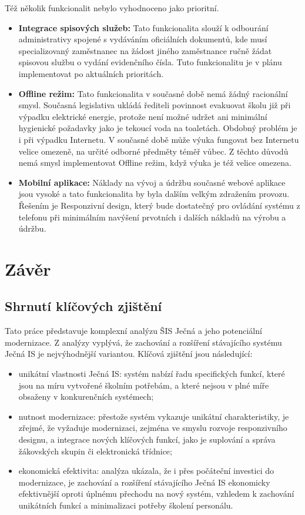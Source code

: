 \documentclass[FM,Proj]{tulthesis}
\begin{document}
Též několik funkcionalit nebylo vyhodnoceno jako prioritní.
\begin{itemize}
    \item \textbf{Integrace spisových služeb:} Tato funkcionalita slouží k odbourání
    administrativy spojené s vydáváním oficiálních dokumentů, kde musí specializovaný zaměstnanec
    na žádost jiného zaměstnance ručně žádat spisovou službu o vydání evidenčního čísla. Tuto
    funkcionalitu je v plánu implementovat po aktuálních prioritách. 
    \item \textbf{Offline režim:} Tato funkcionalita v současné době nemá žádný racionální 
    smysl. Současná legislativa ukládá řediteli povinnost evakuovat školu již při výpadku
    elektrické energie, protože není možné udržet ani minimální hygienické požadavky jako je 
    tekoucí voda na toaletách. Obdobný problém je i při výpadku Internetu. V současné době může
    výuka fungovat bez Internetu velice omezeně, na určité odborné předměty téměř vůbec. Z těchto
    důvodů nemá smysl implementovat Offline režim, když výuka je též velice omezena. 
    \item \textbf{Mobilní aplikace:} Náklady na vývoj a údržbu současné webové aplikace jsou vysoké
    a tato funkcionalita by byla dalším velkým zdražením provozu. Řešením je Responzivní design,
    který bude dostatečný pro ovládání systému z telefonu při minimálním navýšení prvotních i 
    dalších nákladů na výrobu a údržbu.
\end{itemize}

\chapter{Závěr}
\section{Shrnutí klíčových zjištění}
Tato práce představuje komplexní analýzu ŠIS Ječná a jeho potenciální modernizace. Z analýzy
vyplývá, že zachování a rozšíření stávajícího systému Ječná IS je nejvýhodnější variantou. 
Klíčová zjištění jsou následující:

\begin{itemize}
    \item unikátní vlastnosti Ječná IS: systém nabízí řadu specifických funkcí, 
    které jsou na míru vytvořené školním potřebám, a které nejsou v plné míře obsaženy 
    v konkurenčních systémech;
    \item nutnost modernizace: přestože systém vykazuje unikátní charakteristiky, 
    je zřejmé, že vyžaduje modernizaci, zejména ve smyslu rozvoje responzivního designu,
    a integrace nových klíčových funkcí, jako je suplování a správa žákovských skupin či
    elektronická třídnice;
    \item ekonomická efektivita: analýza ukázala, že i přes počáteční investici do 
    modernizace, je zachování a rozšíření stávajícího Ječná IS ekonomicky efektivnější 
    oproti úplnému přechodu na nový systém, vzhledem k zachování unikátních funkcí a 
    minimalizaci potřeby školení personálu.
\end{itemize}
\end{document}
